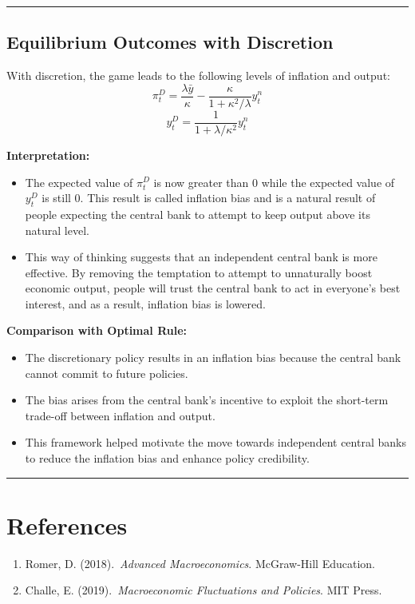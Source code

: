 \documentclass{article}
\begin{document}
\noindent\rule{\linewidth}{0.5pt}

\subsection{Equilibrium Outcomes with Discretion}

With discretion, the game leads to the following levels of inflation and output:
\[ \pi^D_t = \frac{\lambda \bar{y}}{\kappa} - \frac{\kappa}{1 + \kappa^2 / \lambda} y^n_t \]
\[ y^D_t = \frac{1}{1 + \lambda / \kappa^2} y^n_t \]

\textbf{Interpretation:}
\begin{itemize}
    \item The expected value of \(\pi_t^D\) is now greater than 0 while the expected value of \(y_t^D\) is still 0. This result is called inflation bias and is a natural result of people expecting the central bank to attempt to keep output above its natural level.
    \item This way of thinking suggests that an independent central bank is more effective. By removing the temptation to attempt to unnaturally boost economic output, people will trust the central bank to act in everyone's best interest, and as a result, inflation bias is lowered.
\end{itemize}

\textbf{Comparison with Optimal Rule:}
\begin{itemize}
    \item The discretionary policy results in an inflation bias because the central bank cannot commit to future policies.
    \item The bias arises from the central bank's incentive to exploit the short-term trade-off between inflation and output.
    \item This framework helped motivate the move towards independent central banks to reduce the inflation bias and enhance policy credibility.
\end{itemize}

\FloatBarrier

\noindent\rule{\linewidth}{1pt}
\section*{References}
\begin{enumerate}
    \item Romer, D. (2018).\ \textit{Advanced Macroeconomics}. McGraw-Hill Education.
    \item Challe, E. (2019).\ \textit{Macroeconomic Fluctuations and Policies}. MIT Press.
\end{enumerate}
\end{document}
